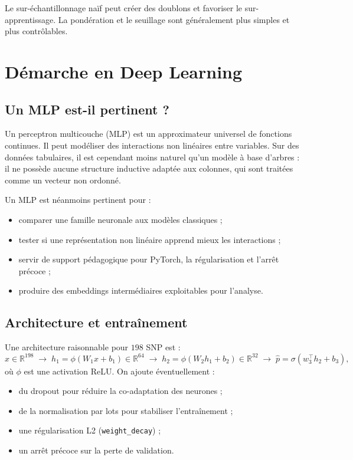 \documentclass[11pt,a4paper]{article}
\begin{document}
Le sur-échantillonnage naïf peut créer des doublons et favoriser le sur-apprentissage. La pondération et le seuillage sont généralement plus simples et plus contrôlables.

\section{Démarche en Deep Learning}

\subsection{Un MLP est-il pertinent ?}
\label{sec:pertinence_mlp}

Un perceptron multicouche (MLP) est un approximateur universel de fonctions continues. Il peut modéliser des interactions non linéaires entre variables. Sur des données tabulaires, il est cependant moins naturel qu'un modèle à base d'arbres : il ne possède aucune structure inductive adaptée aux colonnes, qui sont traitées comme un vecteur non ordonné.

Un MLP est néanmoins pertinent pour :
\begin{itemize}[leftmargin=1.2em]
    \item comparer une famille neuronale aux modèles classiques ;
    \item tester si une représentation non linéaire apprend mieux les interactions ;
    \item servir de support pédagogique pour PyTorch, la régularisation et l'arrêt précoce ;
    \item produire des embeddings intermédiaires exploitables pour l'analyse.
\end{itemize}

\subsection{Architecture et entraînement}

Une architecture raisonnable pour $198$ SNP est :
\[
x \in \mathbb{R}^{198}
\;\longrightarrow\;
h_1 = \phi(W_1 x + b_1) \in \mathbb{R}^{64}
\;\longrightarrow\;
h_2 = \phi(W_2 h_1 + b_2) \in \mathbb{R}^{32}
\;\longrightarrow\;
\hat p = \sigma(w_3^\top h_2 + b_3),
\]
où \(\phi\) est une activation ReLU. On ajoute éventuellement :
\begin{itemize}[leftmargin=1.2em]
    \item du dropout \citep{srivastava2014} pour réduire la co-adaptation des neurones ;
    \item de la normalisation par lots \citep{ioffe2015} pour stabiliser l'entraînement ;
    \item une régularisation L2 (\texttt{weight\_decay}) ;
    \item un arrêt précoce sur la perte de validation.
\end{itemize}
\end{document}
